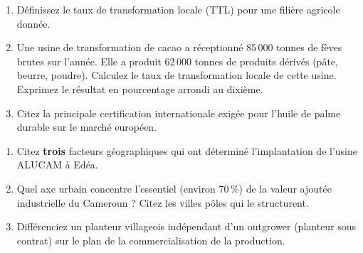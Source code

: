 \documentclass[11pt]{article}
\newcommand{\cle}[1]{{\popxbold\color{popdark}#1}}
\newcounter{popsec}
\newcounter{popsub}
\newcommand{\courssub}[1]{%
  \stepcounter{popsub}%
  \par\vspace{9pt}\noindent{\popxbold\fontsize{11.5}{13}\selectfont\color{popink}{\color{poporange}\thepopsec.\thepopsub}\hspace{6pt}#1}\par\nopagebreak\vspace{4pt}
}
\begin{document}
\begin{exercice}
\begin{enumerate}
    \item Définissez le \cle{taux de transformation locale} (TTL) pour une filière agricole donnée.
    \item Une usine de transformation de cacao a réceptionné 85\,000 tonnes de fèves brutes sur l'année. Elle a produit 62\,000 tonnes de produits dérivés (pâte, beurre, poudre). Calculez le taux de transformation locale de cette usine. Exprimez le résultat en pourcentage arrondi au dixième.
    \item Citez la principale certification internationale exigée pour l'huile de palme durable sur le marché européen.
\end{enumerate}
\end{exercice}

\begin{exercice}
\begin{enumerate}
    \item Citez \textbf{trois} facteurs géographiques qui ont déterminé l'implantation de l'usine ALUCAM à Edéa.
    \item Quel axe urbain concentre l'essentiel (environ 70\,\%) de la valeur ajoutée industrielle du Cameroun ? Citez les villes pôles qui le structurent.
    \item Différenciez un \cle{planteur villageois indépendant} d'un \cle{outgrower} (planteur sous contrat) sur le plan de la commercialisation de la production.
\end{enumerate}
\end{exercice}

\courssub{Je m'entraîne}
\end{document}
